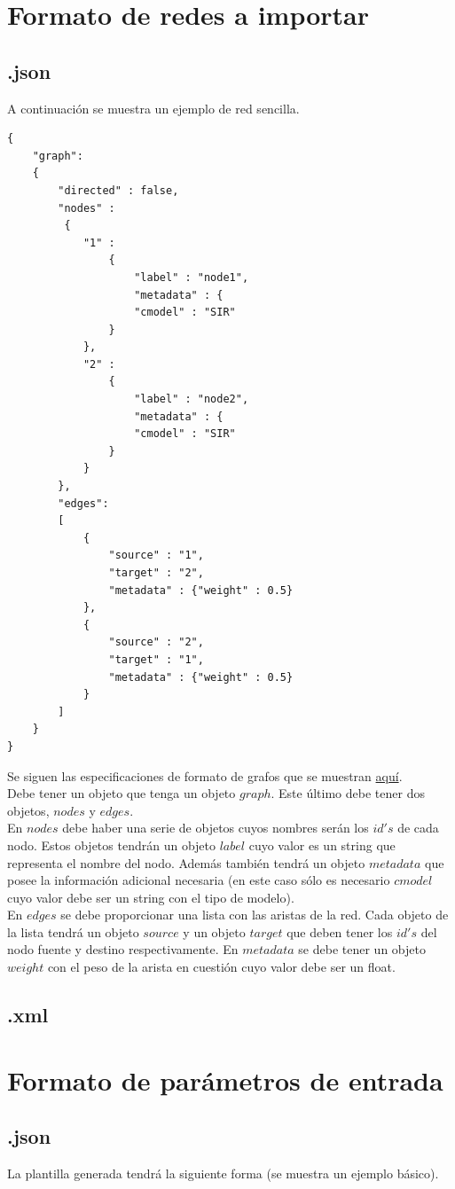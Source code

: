\documentclass[a4paper,12pt]{article}
\begin{document}
\section*{Formato de redes a importar}
\subsection*{.json}
A continuación se muestra un ejemplo de red sencilla.
\begin{lstlisting}
{
	"graph": 
	{
		"directed" : false,
		"nodes" :
		 {
			"1" : 
				{
					"label" : "node1",
					"metadata" : {
					"cmodel" : "SIR"
				}
			},
			"2" : 
				{
					"label" : "node2",
					"metadata" : {
					"cmodel" : "SIR"
				}
			}
		},
		"edges": 
		[
			{
				"source" : "1",
				"target" : "2",
				"metadata" : {"weight" : 0.5}
			},
			{
				"source" : "2",
				"target" : "1",
				"metadata" : {"weight" : 0.5}
			}
		]
	}
}
\end{lstlisting}
Se siguen las especificaciones de formato de grafos que se muestran \href{http://graphml.graphdrawing.org/}{aquí}.\\
Debe tener un objeto que tenga un objeto $graph$. Este último debe tener dos objetos, $nodes$ y $edges$.\\
En $nodes$ debe haber una serie de objetos cuyos nombres serán los $id's$ de cada nodo. Estos objetos tendrán un objeto $label$ cuyo valor es un string que representa el nombre del nodo. Además también tendrá un objeto $metadata$ que posee la información adicional necesaria (en este caso sólo es necesario $cmodel$ cuyo valor debe ser un string con el tipo de modelo).\\
En $edges$ se debe proporcionar una lista con las aristas de la red. Cada objeto de la lista tendrá un objeto $source$ y un objeto $target$ que deben tener los $id's$ del nodo fuente y destino respectivamente. En $metadata$ se debe tener un objeto $weight$ con el peso de la arista en cuestión cuyo valor debe ser un float.

\subsection*{.xml}

\section*{Formato de parámetros de entrada}
\subsection*{.json}
La plantilla generada tendrá la siguiente forma (se muestra un ejemplo básico).
\end{document}
